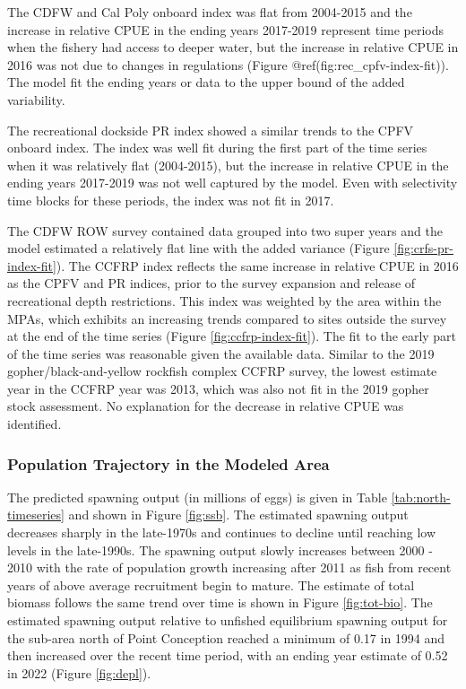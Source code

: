 \documentclass[11pt,
  english,
  letterpaper,
]{article}
\begin{document}
The CDFW and Cal Poly onboard index was flat from 2004-2015 and the increase in relative CPUE in the ending years 2017-2019 represent time periods when the fishery had access to deeper water, but the increase in relative CPUE in 2016 was not due to changes in regulations (Figure @ref(fig:rec\_cpfv-index-fit)). The model fit the ending years or data to the upper bound of the added variability.

The recreational dockside PR index showed a similar trends to the CPFV onboard index. The index was well fit during the first part of the time series when it was relatively flat (2004-2015), but the increase in relative CPUE in the ending years 2017-2019 was not well captured by the model. Even with selectivity time blocks for these periods, the index was not fit in 2017.

The CDFW ROW survey contained data grouped into two super years and the model estimated a relatively flat line with the added variance (Figure \ref{fig:crfs-pr-index-fit}). The CCFRP index reflects the same increase in relative CPUE in 2016 as the CPFV and PR indices, prior to the survey expansion and release of recreational depth restrictions. This index was weighted by the area within the MPAs, which exhibits an increasing trends compared to sites outside the survey at the end of the time series (Figure \ref{fig:ccfrp-index-fit}). The fit to the early part of the time series was reasonable given the available data. Similar to the 2019 gopher/black-and-yellow rockfish complex CCFRP survey, the lowest estimate year in the CCFRP year was 2013, which was also not fit in the 2019 gopher stock assessment. No explanation for the decrease in relative CPUE was identified.

\hypertarget{population-trajectory-in-the-modeled-area}{%
\subsubsection{Population Trajectory in the Modeled Area}\label{population-trajectory-in-the-modeled-area}}

The predicted spawning output (in millions of eggs) is given in Table \ref{tab:north-timeseries} and shown in Figure \ref{fig:ssb}. The estimated spawning output decreases sharply in the late-1970s and continues to decline until reaching low levels in the late-1990s. The spawning output slowly increases between 2000 - 2010 with the rate of population growth increasing after 2011 as fish from recent years of above average recruitment begin to mature. The estimate of total biomass follows the same trend over time is shown in Figure \ref{fig:tot-bio}. The estimated spawning output relative to unfished equilibrium spawning output for the sub-area north of Point Conception reached a minimum of 0.17 in 1994 and then increased over the recent time period, with an ending year estimate of 0.52 in 2022 (Figure \ref{fig:depl}).
\end{document}
